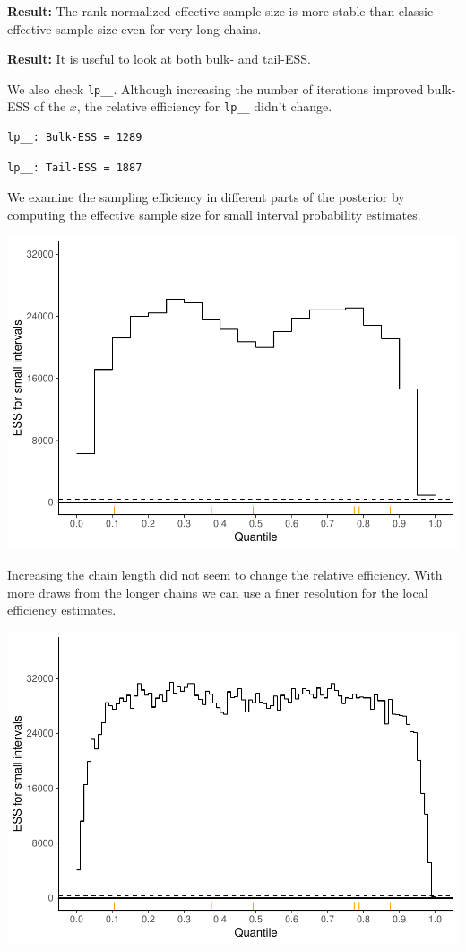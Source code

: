 \documentclass[american,]{article}
\begin{document}
\textbf{Result:} The rank normalized effective sample size is more
stable than classic effective sample size even for very long chains.

\textbf{Result:} It is useful to look at both bulk- and tail-ESS.

We also check \texttt{lp\_\_}. Although increasing the number of
iterations improved bulk-ESS of the \(x\), the relative efficiency for
\texttt{lp\_\_} didn't change.

\begin{verbatim}
lp__: Bulk-ESS = 1289
\end{verbatim}

\begin{verbatim}
lp__: Tail-ESS = 1887
\end{verbatim}

We examine the sampling efficiency in different parts of the posterior
by computing the effective sample size for small interval probability
estimates.

\includegraphics{graphics/local-ess-fit-nom-td20l-1.pdf}

Increasing the chain length did not seem to change the relative
efficiency. With more draws from the longer chains we can use a finer
resolution for the local efficiency estimates.

\includegraphics{graphics/local-ess-fit-nom-td20l-finer-1.pdf}
\end{document}
